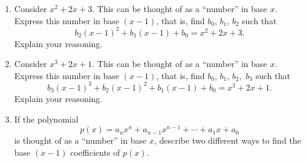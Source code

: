 \begin{problems}
\begin{enumerate}
\item Consider $x^2 + 2x + 3$. This can be thought of as a ``number'' in
  base $x$. Express this number in base $(x-1)$, that is, find $b_0$, $b_1$, $b_2$ such that 
\[
b_2(x-1)^2 +b_1(x-1) + b_0 = x^2 + 2x + 3.
\]
Explain your reasoning.

\item Consider $x^3 + 2x + 1$. This can be thought of as a ``number'' in
  base $x$. Express this number in base $(x-1)$, that is, find $b_0$, $b_1$, $b_2,$ $b_3$ such that 
\[
b_3(x-1)^3 + b_2(x-1)^2 +b_1(x-1) + b_0 = x^3 + 2x + 1.
\]
Explain your reasoning.

\item If the polynomial
\[
p(x) = a_nx^n + a_{n-1}x^{n-1} + \cdots + a_1x + a_0
\]
is thought of as a ``number'' in base $x$, describe two different ways
to find the base $(x-1)$ coefficients of $p(x)$.

\end{enumerate}
\end{problems}



